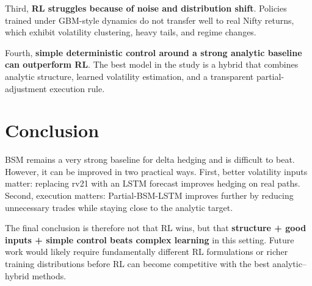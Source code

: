 \documentclass[10pt,a4paper]{article}
\begin{document}
Third, \textbf{RL struggles because of noise and distribution shift}. Policies
trained under GBM-style dynamics do not transfer well to real Nifty returns,
which exhibit volatility clustering, heavy tails, and regime changes.

Fourth, \textbf{simple deterministic control around a strong analytic baseline
can outperform RL}. The best
model in the study is a hybrid that combines analytic structure, learned
volatility estimation, and a transparent partial-adjustment execution rule.

\section{Conclusion}
BSM remains a very strong baseline for delta hedging and is difficult to beat.
However, it can be improved in two practical ways. First, better volatility
inputs matter: replacing rv21 with an LSTM forecast improves hedging on real
paths. Second, execution matters: Partial-BSM-LSTM improves further by reducing
unnecessary trades while staying close to the analytic target.

The final conclusion is therefore not that RL wins, but that
\textbf{structure + good inputs + simple control beats complex learning} in
this setting. Future work would likely require fundamentally different RL
formulations or richer training distributions before RL can become competitive
with the best analytic--hybrid methods.

\newpage
\end{document}

